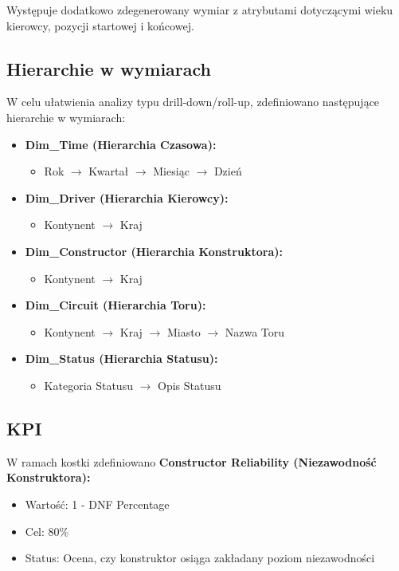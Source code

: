 \documentclass[a4paper,12pt]{article}
\begin{document}
Występuje dodatkowo zdegenerowany wymiar z atrybutami dotyczącymi wieku kierowcy, pozycji startowej i końcowej.

\subsection{Hierarchie w wymiarach}
W celu ułatwienia analizy typu drill-down/roll-up, zdefiniowano następujące hierarchie w wymiarach:
\begin{itemize}
  \item \textbf{Dim\_Time (Hierarchia Czasowa):}
        \begin{itemize}
          \item Rok $\rightarrow$ Kwartał $\rightarrow$ Miesiąc $\rightarrow$ Dzień
        \end{itemize}
  \item \textbf{Dim\_Driver (Hierarchia Kierowcy):}
        \begin{itemize}
          \item Kontynent $\rightarrow$ Kraj
        \end{itemize}
  \item \textbf{Dim\_Constructor (Hierarchia Konstruktora):}
        \begin{itemize}
          \item Kontynent $\rightarrow$ Kraj
        \end{itemize}
  \item \textbf{Dim\_Circuit (Hierarchia Toru):}
        \begin{itemize}
          \item Kontynent $\rightarrow$ Kraj $\rightarrow$ Miasto $\rightarrow$ Nazwa Toru
        \end{itemize}
  \item \textbf{Dim\_Status (Hierarchia Statusu):}
        \begin{itemize}
          \item Kategoria Statusu $\rightarrow$ Opis Statusu
        \end{itemize}
\end{itemize}

\subsection{KPI}

W ramach kostki zdefiniowano \textbf{Constructor Reliability (Niezawodność Konstruktora):}

\begin{itemize}
  \item Wartość: 1 - DNF Percentage
  \item Cel: 80\%
  \item Status: Ocena, czy konstruktor osiąga zakładany poziom niezawodności
\end{itemize}
\end{document}
